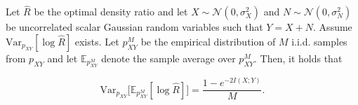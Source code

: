 \begin{lemma}
Let $\hat{R}$ be the optimal density ratio and let  $X\sim \mathcal{N}(0,\sigma_X^2)$ and $N\sim \mathcal{N}(0,\sigma_N^2)$ be uncorrelated scalar Gaussian random variables such that $Y=X+N$. Assume $\text{Var}_{p_{XY}}[\log \hat{R}]$ exists. Let $p^M_{XY}$ be the empirical distribution of $M$ i.i.d. samples from $p_{XY}$ and let $\mathbb{E}_{p^M_{XY}}$ denote the sample average over $p^M_{XY}$. Then, it holds that

\begin{equation}
\text{Var}_{p_{XY}}\bigl[\mathbb{E}_{p^M_{XY}} [\log \hat{R}] \bigr] = \frac{ 1-e^{-2I(X;Y)}}{M}.
\end{equation}
\end{lemma}

